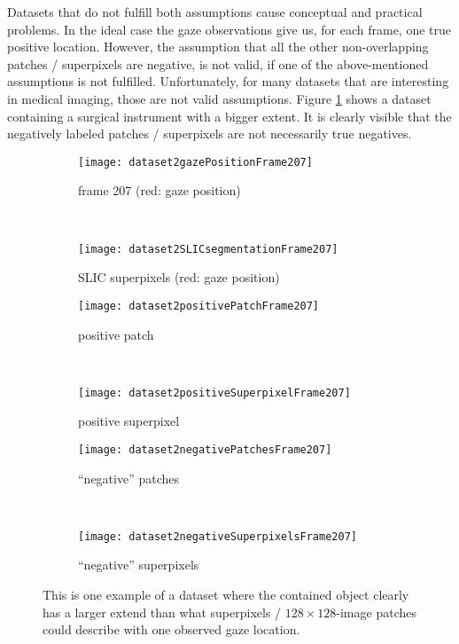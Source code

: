 Datasets that do not fulfill both assumptions cause conceptual and practical problems. In the ideal case the gaze observations give us, for each frame, one true positive location. However, the assumption that all the other non-overlapping patches / superpixels are negative, is not valid, if one of the above-mentioned assumptions is not fulfilled. Unfortunately, for many datasets that are interesting in medical imaging, those are not valid assumptions. Figure \ref{fig:nonValidAssumption} shows a dataset containing a surgical instrument with a bigger extent. 
It is clearly visible that the negatively labeled patches / superpixels are not necessarily true negatives.

\begin{figure}[ht]
	\centering
	\begin{subfigure}[h]{0.48\textwidth}
		\texttt{[image: dataset2gazePositionFrame207]}
		\caption*{frame 207 (red: gaze position)}
	\end{subfigure}
	~
	\begin{subfigure}[h]{0.48\textwidth}
	    \texttt{[image: dataset2SLICsegmentationFrame207]}
	    \caption*{SLIC superpixels (red: gaze position)}
	\end{subfigure}
	
	\vspace{3mm}
	\begin{subfigure}[h]{0.31\textwidth}
		\texttt{[image: dataset2positivePatchFrame207]}	
		\caption*{positive patch}
	\end{subfigure}
	~
	\begin{subfigure}[h]{0.31\textwidth}
		\texttt{[image: dataset2positiveSuperpixelFrame207]}	
		\caption*{positive superpixel}
	\end{subfigure}
	
	\vspace{3mm}
		\begin{subfigure}[h]{0.48\textwidth}
		\texttt{[image: dataset2negativePatchesFrame207]}	
		\caption*{``negative'' patches}
	\end{subfigure}
	~
	\begin{subfigure}[h]{0.48\textwidth}
		\texttt{[image: dataset2negativeSuperpixelsFrame207]}	
		\caption*{``negative'' superpixels}
	\end{subfigure}	
	\caption{This is one example of a dataset where the contained object clearly has a larger extend than what superpixels / $128 \times 128$-image patches could describe with one observed gaze location.}
	\label{fig:nonValidAssumption}
\end{figure}


